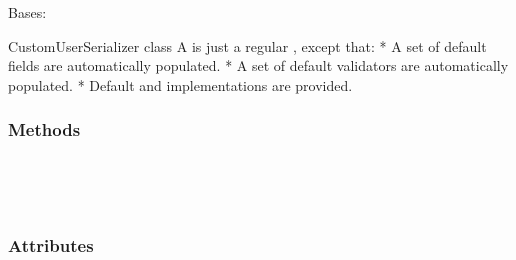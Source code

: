 \documentclass[letterpaper,10pt,english]{sphinxmanual}
\begin{document}
\begin{fulllineitems}
\label{\detokenize{vtcvlp:vtcuser.serializers.VideoLinkSerializer}}
Bases: 

CustomUserSerializer class
A  is just a regular , except that:
* A set of default fields are automatically populated.
* A set of default validators are automatically populated.
* Default  and  implementations are provided.
\subsubsection*{Methods}


\begin{savenotes}\sphinxatlongtablestart\begin{longtable}[c]{}
\hline

\endfirsthead

%
{}\\
\hline

\endhead

\hline
{}\\
\endfoot

\endlastfoot

\end{longtable}\sphinxatlongtableend\end{savenotes}
\subsubsection*{Attributes}


\begin{savenotes}\sphinxatlongtablestart\begin{longtable}[c]{}
\hline

\endfirsthead

%
{}\\
\hline


\end{longtable}
\end{savenotes}
\end{fulllineitems}
\end{document}
